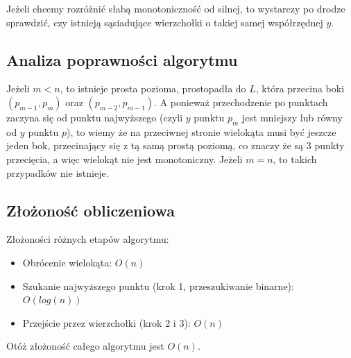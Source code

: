 \documentclass[12pt, a4paper]{article}
\begin{document}
Jeżeli chcemy rozróżnić słabą monotoniczność od silnej, to wystarczy po drodze sprawdzić, czy istnieją sąsiadujące wierzchołki o takiej
samej współrzędnej $y$.

\subsection*{Analiza poprawności algorytmu}

Jeżeli $m < n$, to istnieje prosta pozioma, prostopadła do $L$, która przecina boki $(p_{m-1}, p_{m})$ oraz $(p_{m-2}, p_{m-1})$. A ponieważ przechodzenie po punktach zaczyna się od punktu najwyższego (czyli $y$ punktu $p_m$ jest mniejszy lub równy od $y$ punktu $p$), to wiemy
że na przeciwnej stronie wielokąta musi być jeszcze jeden bok, przecinający się z tą samą prostą poziomą, co znaczy że są 3 punkty przecięcia, a więc wielokąt nie jest monotoniczny. Jeżeli $m = n$, to takich przypadków nie istnieje.


\subsection*{Złożoność obliczeniowa}

Złożoności różnych etapów algorytmu:
\begin{itemize}
    \item Obrócenie wielokąta: $O(n)$
    \item Szukanie najwyższego punktu (krok 1, przeszukiwanie binarne): $O(log(n))$
    \item Przejście przez wierzchołki (krok 2 i 3): $O(n)$
\end{itemize}
Otóż złożoność całego algorytmu jest $O(n)$.
\end{document}
